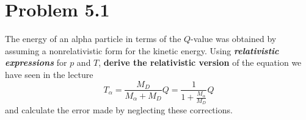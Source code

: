 \documentclass[12pt,a4paper]{article}
\begin{document}
	\section*{
		Problem 5.1
	}
	\begin{problem}
		The energy of an alpha particle in terms of the $Q$-value was obtained by
		assuming a nonrelativistic form for the kinetic energy. Using \textit{\textbf{relativistic
		expressions}} for $p$ and $T$, \textbf{derive the relativistic version} of the equation
		we have seen in the lecture
		\begin{equation}
			\label{eq:t_alpha0}
		    T_\alpha 
			= \frac{M_D}{M_\alpha + M_D}Q 
			= \frac{1}{1+ \frac{M_\alpha}{M_D}}Q  
		\end{equation}
		and calculate the error made by neglecting these corrections.
	\end{problem}
\end{document}
